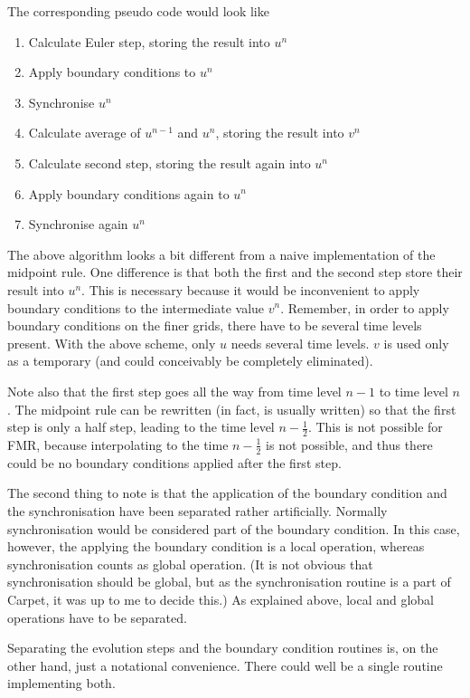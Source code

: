 The corresponding pseudo code would look like
\begin{enumerate}
\item
Calculate Euler step, storing the result into $u^n$
\item  
Apply boundary conditions to $u^n$
\item  
Synchronise $u^n$
\item  
Calculate average of $u^{n-1}$ and $u^n$, storing the result into
$v^n$
\item  
Calculate second step, storing the result again into $u^n$
\item
Apply boundary conditions again to $u^n$
\item  
Synchronise again $u^n$
\end{enumerate}

The above algorithm looks a bit different from a naive implementation
of the midpoint rule.  One difference is that both the first and the
second step store their result into $u^n$.  This is necessary because
it would be inconvenient to apply boundary conditions to the
intermediate value $v^n$.  Remember, in order to apply boundary
conditions on the finer grids, there have to be several time levels
present.  With the above scheme, only $u$ needs several time levels.
$v$ is used only as a temporary (and could conceivably be completely
eliminated).

Note also that the first step goes all the way from time level $n-1$
to time level $n$.  The midpoint rule can be rewritten (in fact, is
usually written) so that the first step is only a half step, leading
to the time level $n - \frac{1}{2}$.  This is not possible for FMR,
because interpolating to the time $n - \frac{1}{2}$ is not possible,
and thus there could be no boundary conditions applied after the first
step.

The second thing to note is that the application of the boundary
condition and the synchronisation have been separated rather
artificially.  Normally synchronisation would be considered part of
the boundary condition.  In this case, however, the applying the
boundary condition is a local operation, whereas synchronisation
counts as global operation.  (It is not obvious that synchronisation
should be global, but as the synchronisation routine is a part of
Carpet, it was up to me to decide this.)  As explained above, local
and global operations have to be separated.

Separating the evolution steps and the boundary condition routines is,
on the other hand, just a notational convenience.  There could well be
a single routine implementing both.

